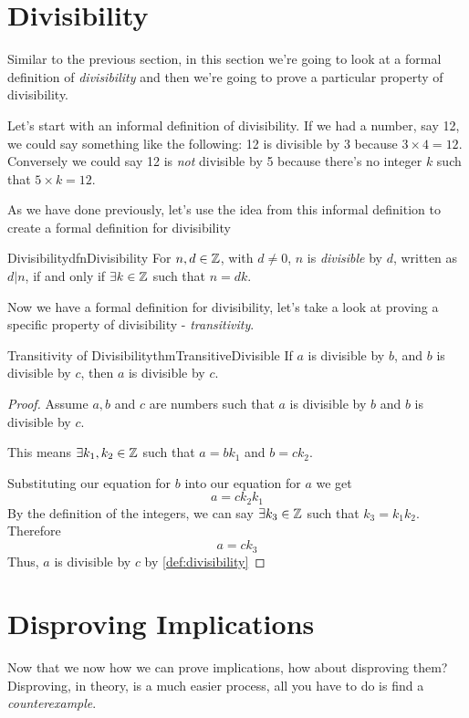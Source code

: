 \section{Divisibility}
Similar to the previous section, in this section we're going to look at a formal definition of \emph{divisibility} and then we're going to prove a particular property of divisibility.

Let's start with an informal definition of divisibility. If we had a number, say 12, we could say something like the following: 12 is divisible by 3 because $3 \times 4 = 12$. Conversely we could say 12 is \emph{not} divisible by 5 because there's no integer $k$ such that $5 \times k = 12$.

As we have done previously, let's use the idea from this informal definition to create a formal definition for divisibility

\begin{dfn}[label={def:divisibility}]{Divisibility}{dfnDivisibility}
    For $n, d \in \mathbb{Z}$, with $d \neq 0$, $n$ is \emph{divisible} by $d$, written as $d | n$, if and only if $\exists k \in \mathbb{Z}$ such that $n = dk$.
\end{dfn}
\vspace{0.5cm}
Now we have a formal definition for divisibility, let's take a look at proving a specific property of divisibility - \emph{transitivity}.

\begin{theorem}[label={theorem:transitiveDivisible}]{Transitivity of Divisibility}{thmTransitiveDivisible}
    If $a$ is divisible by $b$, and $b$ is divisible by $c$, then $a$ is divisible by $c$.
\end{theorem}
\begin{proof}
    Assume $a,b$ and $c$ are numbers such that $a$ is divisible by $b$ and $b$ is divisible by $c$.

    This means $\exists k_1,k_2 \in \mathbb{Z}$ such that $a = bk_1$ and $b = ck_2$.

    Substituting our equation for $b$ into our equation for $a$ we get
    $$a = ck_2k_1$$
    By the definition of the integers, we can say $\exists k_3 \in \mathbb{Z}$ such that $k_3 = k_1k_2$. Therefore
    $$a = ck_3$$
    Thus, $a$ is divisible by $c$ by \cref{def:divisibility}
\end{proof}

\section{Disproving Implications}
Now that we now how we can prove implications, how about disproving them? Disproving, in theory, is a much easier process, all you have to do is find a \emph{counterexample}.

